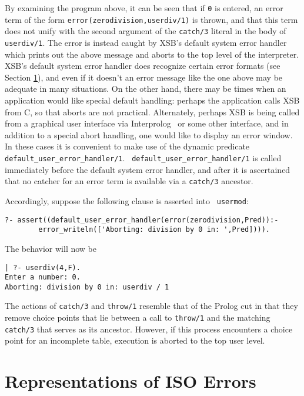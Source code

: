 \noindent
By examining the program above, it can be seen that if {\tt 0} is
entered, an error term of the form {\tt error(zerodivision,userdiv/1)}
is thrown, and that this term does not unify with the second argument
of the {\tt catch/3} literal in the body of {\tt userdiv/1}.  The
error is instead caught by XSB's default system error handler which
prints out the above message and aborts to the top level of the
interpreter.  XSB's default system error handler does recognize
certain error formats (see Section \ref{}), and even if it doesn't an
error message like the one above may be adequate in many situations.
On the other hand, there may be times when an application would like
special default handling: perhaps the application calls XSB from C, so
that aborts are not practical.  Alternately, perhaps XSB is being
called from a graphical user interface via Interprolog~\cite{Cale01}
or some other interface, and in addition to a special abort handling,
one would like to display an error window.  In these cases it is
convenient to make use of the dynamic predicate {\tt
default\_user\_error\_handler/1}.  {\tt
default\_user\_error\_handler/1} is called immediately before the
default system error handler, and after it is ascertained that no
catcher for an error term is available via a {\tt catch/3} ancestor.

Accordingly, suppose the following clause is asserted into {\tt
usermod}:
%
\begin{small}
\begin{verbatim}
?- assert((default_user_error_handler(error(zerodivision,Pred)):- 
        error_writeln(['Aborting: division by 0 in: ',Pred]))).
\end{verbatim}
\end{small}
%
The behavior will now be
\begin{small}
\begin{verbatim}
| ?- userdiv(4,F).
Enter a number: 0.
Aborting: division by 0 in: userdiv / 1
\end{verbatim}
\end{small}
The actions of {\tt catch/3} and {\tt throw/1} resemble that of the
Prolog cut in that they remove choice points that lie between a call
to {\tt throw/1} and the matching {\tt catch/3} that serves as its
ancestor.  However, if this process encounters a choice point for an
incomplete table, execution is aborted to the top user level.

\section{Representations of ISO Errors}

